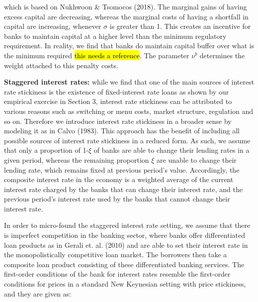 \documentclass[12pt]{article}
\numberwithin{equation}{section}
\begin{document}
which is based on Nukhwoon \& Tsomocos (2018). The marginal gains of having excess capital are decreasing, whereas the marginal costs of having a shortfall in capital are increasing, whenever $\sigma$ is greater than 1. This creates an incentive for banks to maintain capital at a higher level than the minimum regulatory requirement. In reality, we find that banks do maintain capital buffer over what is the minimum required \hl{this needs a reference}. The parameter $\nu^b$ determines the weight attached to this penalty costs.



\textbf{Staggered interest rates:} while we find that one of the main sources of interest rate stickiness is the existence of fixed-interest rate loans as shown by our empirical exercise in Section 3, interest rate stickiness can be attributed to various reasons such as switching or menu costs, market structure, regulation and so on. Therefore we introduce interest rate stickiness in a broader sense by modeling it as in Calvo (1983). This approach has the benefit of including all possible sources of interest rate stickiness in a reduced form. As such, we assume that only a proportion of 1-$\xi$ of banks are able to change their lending rates in a given period, whereas the remaining proportion $\xi$ are unable to change their lending rate, which remains fixed at previous period's value. Accordingly, the composite interest rate in the economy is a weighted average of the current interest rate charged by the banks that can change their interest rate, and the previous period's interest rate used by the banks that cannot change their interest rate. 

In order to micro-found the staggered interest rate setting, we assume that there is imperfect competition in the banking sector, where banks offer differentiated loan products as in Gerali et. al. (2010) and are able to set their interest rate in the monopolistically competitive loan market. The borrowers then take a composite loan product consisting of these differentiated banking services. The first-order conditions of the bank for interest rates resemble the first-order conditions for prices in a standard New Keynesian setting with price stickiness, and they are given as: 
\end{document}
